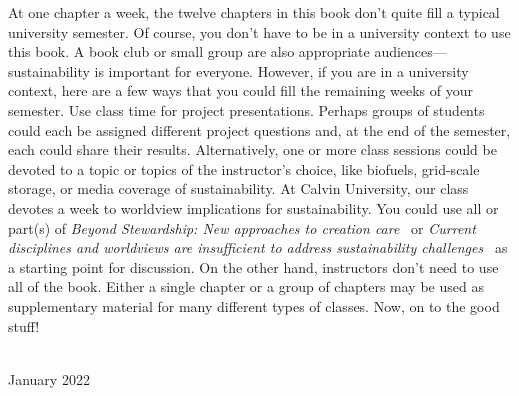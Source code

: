 {    At one chapter a week, the twelve chapters in this book don't quite fill a typical 
university semester. 
Of course, you don't have to be in a university context to use this book. 
    A book club or small group are also appropriate audiences---sustainability 
    is important for everyone. 
    However, if you are in a university context, here are a few ways that you could fill the 
    remaining weeks of your semester. 
    Use class time for project presentations. 
    Perhaps groups of students could each be assigned different project questions and, 
    at the end of the semester, each could share their results.
    Alternatively, one or more class sessions could be devoted to a topic or topics 
    of the instructor's choice, like biofuels, grid-scale storage, 
or media coverage of sustainability. 
At Calvin University, our class devotes a week to worldview implications for 
sustainability. 
You could use all or part(s) of \emph{Beyond Stewardship: New approaches to 
creation care}~\citep{Warners:2019aa}
or \emph{Current disciplines and worldviews are insufficient
to address sustainability challenges}~\cite{VanH2019} as a starting point for discussion. 
On the other hand, instructors don't need to use all of the book.
Either a single chapter or a group of chapters may be used as supplementary 
material for many different types of classes.
    Now, on to the good stuff!
      
      \vspace*{2pc}
    \noindent\AUTHORS\\
    \noindent January 2022
  }
  
  
  
  
  
  
  
  \cleardoublepage